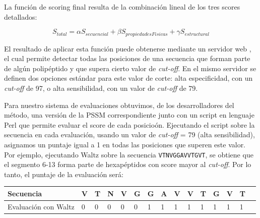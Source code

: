 La función de scoring final resulta de la combinación lineal de los tres scores detallados:

{
\large
\begin{equation}
S_{total}= \alpha S_{secuencial} + \beta S_{propiedadesFisicas} + \gamma S_{estructural}
\end{equation}
}


El resultado de aplicar esta función puede obtenerse mediante un servidor web \cite{waltzWeb}, el cual permite detectar todas las posiciones de una secuencia que forman parte de algún polipéptido y que supera cierto
valor de \textit{cut-off}. En el mismo servidor se definen dos opciones estándar para este valor de corte: alta especificidad, con un \textit{cut-off} de 97, o alta sensibilidad, con un valor de \textit{cut-off} de 79.

Para nuestro sistema de evaluaciones obtuvimos, de los desarrolladores del método, una versión de la PSSM correspondiente junto con un script en lenguaje Perl que permite evaluar el score de cada posicioón.
Ejecutando el script sobre la secuencia en cada evaluación, usando un valor de \textit{cut-off} = 79 (alta sensibilidad), asignamos un puntaje igual a 1 en todas las posiciones que superen este valor.
Por ejemplo, ejecutando Waltz sobre la secuencia \texttt{VTNVGGAVVTGVT}, se obtiene que el segmento 6-13 forma parte de hexapéptidos con score mayor al \textit{cut-off}. Por lo tanto, el puntaje de la evaluación será:


\vspace{0.3cm}
\noindent
\begin{center}
\begin{tabular}{lllllllllllllll} 
\hline    
Secuencia & \textbf{V} & \textbf{T} & \textbf{N} & \textbf{V} & \textbf{G} & \textbf{G} & \textbf{A} & \textbf{V} & \textbf{V} &\textbf{T} & \textbf{G} & \textbf{V} & \textbf{T}  \\ \hline
Evaluación con Waltz & 0 & 0 & 0 & 0 & 0 & 1 & 1 & 1 & 1 & 1 & 1 & 1 & 1 \\ \hline
\end{tabular}
\end{center}







